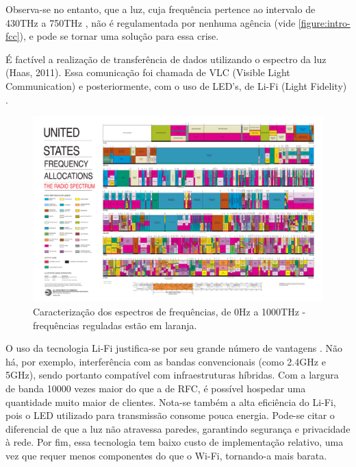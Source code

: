 	Observa-se no entanto, que a luz, cuja frequência pertence ao intervalo de 430THz a 750THz \cite{vision},  não é regulamentada por nenhuma agência (vide \autoref{figure:intro-fcc}), e pode se tornar uma solução para essa crise.
	
	 É factível a realização de transferência de dados utilizando o espectro da luz (Haas, 2011). Essa comunicação foi chamada de VLC (Visible Light Communication) e posteriormente, com o uso de LED's, de Li-Fi (Light Fidelity) \cite{what-is-lifi}. \par 
	 
	\begin{figure}[h!]
	 	\caption{\label{figure:intro-fcc}Caracterização dos espectros de frequências, de 0Hz a 1000THz - frequências reguladas estão em laranja.}
		\centering
 		\includegraphics[width=\textwidth, trim={36.5cm 3.1cm 40cm 61cm},clip]{2003-allochrt.pdf}	
	\end{figure}
	
	O uso da tecnologia Li-Fi justifica-se por seu grande número de vantagens \cite{comparison-wifi}. Não há, por exemplo, interferência com as bandas convencionais (como 2.4GHz e 5GHz), sendo portanto compatível com infraestruturas híbridas. Com a largura de banda 10000 vezes maior do que a de RFC, é possível hospedar uma quantidade muito maior de clientes. Nota-se também a alta eficiência do Li-Fi, pois o LED utilizado para transmissão consome pouca energia. Pode-se citar o diferencial de que a luz não atravessa paredes, garantindo segurança e privacidade à rede. Por fim, essa tecnologia tem baixo custo de implementação relativo, uma vez que requer menos componentes do que o Wi-Fi, tornando-a mais barata. \par
	
